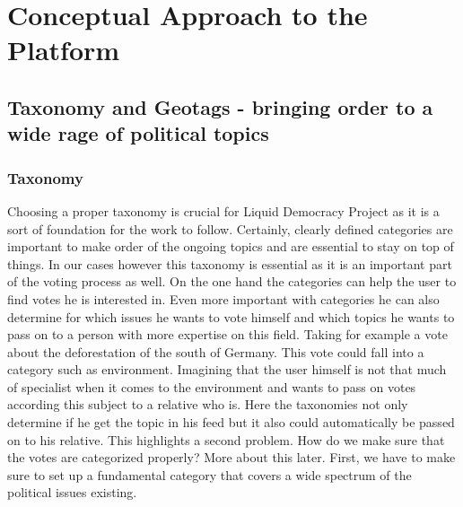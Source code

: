 



\section{Conceptual Approach to the Platform}
\label{sec:Conceptual_Approach}
\subsection{Taxonomy and Geotags - bringing order to a wide rage of political topics}
\label{sec:Model_Contexts}
\subsubsection{Taxonomy}
Choosing a proper taxonomy is crucial for Liquid Democracy Project as it is a sort of foundation for the work to follow. Certainly, clearly defined categories are important to make order of the ongoing topics and are essential to stay on top of things. In our cases however this taxonomy is essential as it is an important part of the voting process as well. On the one hand the categories can help the user to find votes he is interested in. Even more important with categories he can also determine for which issues he wants to vote himself and which topics he wants to pass on to a person with more expertise on this field. Taking for example a vote about the deforestation of the south of Germany. This vote could fall into a category such as environment. Imagining that the user himself is not that much of specialist when it comes to the environment and wants to pass on votes according this subject to a relative who is. Here the taxonomies not only determine if he get the topic in his feed but it also could automatically be passed on to his relative. This highlights a second problem. How do we make sure that the votes are categorized properly? More about this later. First, we have to make sure to set up a fundamental category that covers a wide spectrum of the political issues existing.


